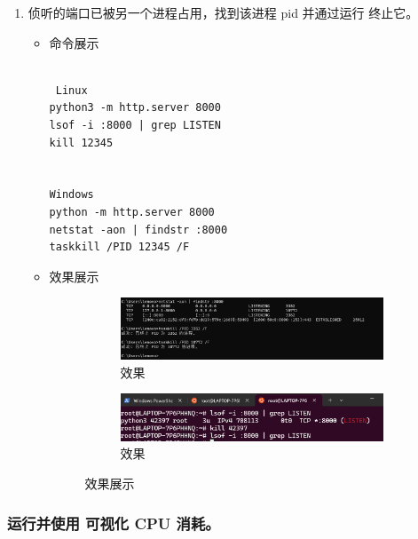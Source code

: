\documentclass[UTF8]{ctexart}
\begin{document}
\begin{enumerate}
  \item 侦听的端口已被另一个进程占用，找到该进程 pid 并通过运行 终止它。
  \begin{itemize}
  \item 命令展示
  \begin{verbatim}

 Linux
python3 -m http.server 8000
lsof -i :8000 | grep LISTEN
kill 12345


Windows
python -m http.server 8000
netstat -aon | findstr :8000
taskkill /PID 12345 /F

  \end{verbatim}
\item 效果展示
 \begin{figure}[H]
    \centering
    \begin{subfigure}[b]{0.48\textwidth}
        \includegraphics[width=\textwidth]{131} %
        \caption{效果}
        \label{fig:left}
    \end{subfigure}
    \hfill
    \begin{subfigure}[b]{0.48\textwidth}
        \includegraphics[width=\textwidth]{132} %
        \caption{效果}
        \label{fig:right}
    \end{subfigure}
    \caption{效果展示}
    \label{fig:side_by_side}
\end{figure}
  \end{itemize}
\end{enumerate}



\subsubsection{运行并使用 可视化 CPU 消耗。}
\end{document}
